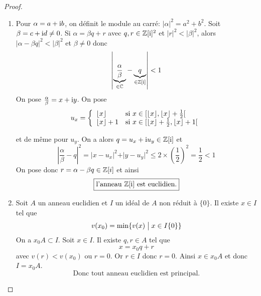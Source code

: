\begin{proof}
	\phantom{}
	\begin{enumerate}
		\item Pour $\alpha=a+\mathrm{i} b$, on définit le module au carré: $\vert\alpha\vert^{2}=a^{2}+b^{2}$. Soit $\beta=c+\mathrm{i} d\neq0$. Si $\alpha=\beta q+r$ avec $q,r\in\mathbb{Z}[\mathrm{i}]^{2}$ et $\vert r\vert^{2}<\vert \beta\vert^{2}$, alors $\vert\alpha-\beta q\vert^{2}<\vert\beta\vert^{2}$ et $\beta\neq0$ donc
		\begin{equation}
			\left\vert\underbrace{\frac{\alpha}{\beta}}_{\in\mathbb{C}}-\underbrace{q}_{\in\mathbb{Z}[\mathrm{i}]}\right\vert< 1
		\end{equation}
		On pose $\frac{\alpha}{\beta}=x+\mathrm{i} y$. On pose 
		\begin{equation}
			u_{x}=
			\left\{
				\begin{array}[]{ll}
					\lfloor x\rfloor & \text{si }x\in[\lfloor x\rfloor,\lfloor x\rfloor+\frac{1}{2}[\\
					\lfloor x\rfloor+1 & \text{si }x\in[\lfloor x\rfloor+\frac{1}{2},\lfloor x\rfloor+1[
				\end{array}
			\right.
		\end{equation}

		et de même pour $u_{y}$. On a alors $q=u_{x}+\mathrm{i} u_{y}\in\mathbb{Z}[\mathrm{i}]$ et 
		\begin{equation}
			\left\vert\frac{\alpha}{\beta}-q\right\vert^{2}=\vert x-u_{x}\vert^{2}+\vert y-u_{y}\vert^{2}\leqslant2\times \left(\frac{1}{2}\right)^{2}=\frac{1}{2}<1
		\end{equation}
		On pose donc $r=\alpha-\beta q\in\mathbb{Z}[i]$ et ainsi 
		\begin{equation}
			\boxed{\text{l'anneau }\mathbb{Z}[\mathrm{i}]\text{ est euclidien.}}
		\end{equation}

		\item Soit $A$ un anneau euclidien et $I$ un idéal de $A$ non réduit à $\{0\}$. Il existe $x\in I$ tel que 
		\begin{equation}
			v(x_{0})=\min\{v(x)\bigm| x\in I\{0\}\}
		\end{equation}
		On a $x_{0}A\subset I$. Soit $x\in I$. Il existe $q,r\in A$ tel que 
		\begin{equation}
			x=x_{0}q+r
		\end{equation}
		avec $v(r)<v(x_{0})$ ou $r=0$. Or $r\in I$ donc $r=0$. Ainsi $x\in x_{0}A$ et donc $I=x_{0}A$. 
		\begin{equation}
			\boxed{\text{Donc tout anneau euclidien est principal.}}
		\end{equation}
	\end{enumerate}
\end{proof}

